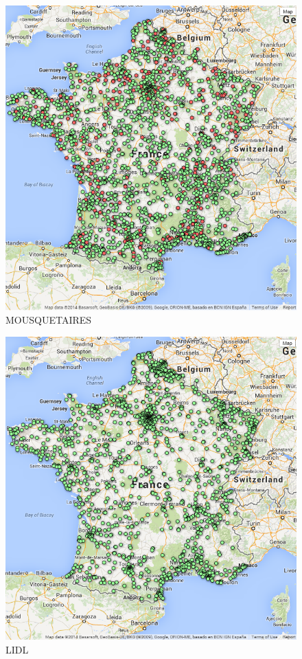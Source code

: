 \documentclass[11pt]{article}
\begin{document}
\begin{figure}[!h]
    \caption{MOUSQUETAIRES}
	\centering
		\includegraphics[width=16cm]{images/MOUSQUETAIRES.png}
\end{figure}

\begin{figure}[!h]
    \caption{LIDL}
	\centering
		\includegraphics[width=16cm]{images/LIDL.png}
\end{figure}
\end{document}
